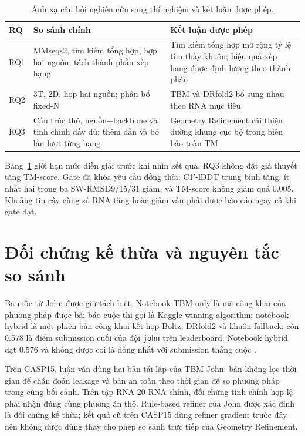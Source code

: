 \documentclass[12pt,a4paper,oneside]{report}
\begin{document}
\begin{table}[H]
\centering
\caption{Ánh xạ câu hỏi nghiên cứu sang thí nghiệm và kết luận được phép.}
\label{tab:rq_map_vi}
\begin{tabularx}{\textwidth}{p{1.0cm}X X}
\toprule
RQ & So sánh chính & Kết luận được phép \\
\midrule
RQ1 & MMseqs2, tìm kiếm tổng hợp, hợp hai nguồn; tách thành phần xếp hạng & Tìm kiếm tổng hợp mở rộng tỷ lệ tìm thấy khuôn; hiệu quả xếp hạng được định lượng theo thành phần \\
RQ2 & 3T, 2D, hợp hai nguồn; phân bổ fixed-N & TBM và DRfold2 bổ sung nhau theo RNA mục tiêu \\
RQ3 & Cấu trúc thô, nguồn+backbone và tinh chỉnh đầy đủ; thêm dần và bỏ lần lượt từng hạng & Geometry Refinement cải thiện đường khung cục bộ trong biên bảo toàn TM \\
\bottomrule
\end{tabularx}
\end{table}

Bảng~\ref{tab:rq_map_vi} giới hạn mức diễn giải trước khi nhìn kết quả. RQ3 không đặt giả
thuyết tăng TM-score. Gate đã khóa yêu cầu đồng thời: C1'-lDDT trung bình tăng, ít nhất
hai trong ba SW-RMSD9/15/31 giảm, và TM-score không giảm quá 0.005. Khoảng tin cậy cùng
số RNA tăng hoặc giảm vẫn phải được báo cáo ngay cả khi gate đạt.

\section{Đối chứng kế thừa và nguyên tắc so sánh}

Ba mốc từ John được giữ tách biệt. Notebook TBM-only là mã công khai của phương pháp
được bài báo cuộc thi gọi là Kaggle-winning algorithm; notebook hybrid là một phiên bản
công khai kết hợp Boltz, DRfold2 và khuôn fallback; còn 0.578 là điểm submission cuối
của đội \texttt{john} trên leaderboard. Notebook hybrid đạt 0.576 và không được coi là
đồng nhất với submission thắng cuộc \cite{competition_paper,kaggle_top1,kaggle_hybrid}.

Trên CASP15, luận văn dùng hai bản tái lập của TBM John: bản không lọc thời gian để
chẩn đoán leakage và bản an toàn theo thời gian để so phương pháp trong cùng bối cảnh. Trên tập RNA
20 RNA chính, đối chứng tinh chỉnh hợp lệ phải nhận đúng cùng phương án thô. Rule-based
refiner của John được xác định là đối chứng kế thừa; kết quả cũ trên CASP15 dùng refiner
gradient trước đây nên không được dùng thay cho phép so sánh trực tiếp của Geometry Refinement.
\end{document}
